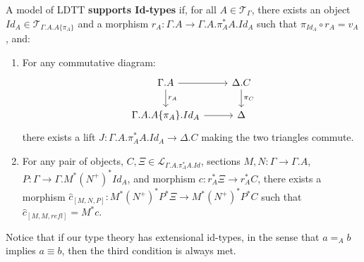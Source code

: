 \documentclass[a4paper,english]{lipics-v2018}
\begin{document}
\begin{definition}[Id-types]\label{idsemantic}
  A model of LDTT \textbf{supports Id-types} if, for all $A \in \mathcal{T}_{\Gamma}$, there exists an object $Id_A \in \mathcal{T}_{\Gamma.A.A\{\pi_A\}}$ and a morphism $r_A : \Gamma.A \to \Gamma.A.\pi_A^*A.Id_{A}$ such that $\pi_{Id_A} \circ r_A = v_A$, and:
  \begin{enumerate}
\item For any commutative diagram:
  \[
    \begin{tikzcd}
    \Gamma.A \ar[d, "r_A"] \ar[r] & \Delta.C \ar[d, "\pi_C"]\\
    \Gamma.A.A\{\pi_A\}.Id_A \ar[r] & \Delta
    \end{tikzcd}
  \]
  there exists a lift $J: \Gamma.A.\pi_A^*A.Id_A \to \Delta.C$ making the two triangles commute.
\item For any pair of objects, $C, \Xi \in \mathcal{L}_{\Gamma.A.\pi_A^*A.Id}$, sections $M, N : \Gamma \to \Gamma.A$, $P : \Gamma \to \Gamma.M^*(N^+)^*Id_A$, and morphism $c : r_A^*\Xi \to r_A^*C$, there exists a morphism $\hat c_{[M,N,P]} : M^*(N^+)^*P^*\Xi \to M^*(N^+)^*P^*C$ such that $\hat c_{[M,M,refl]} = M^*c$.
\end{enumerate}
\end{definition}
Notice that if our type theory has extensional id-types, in the sense that $a =_A b$ implies $a \equiv b$, then the third condition is always met.
\end{document}
